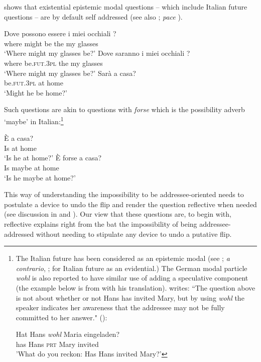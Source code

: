 \documentclass[output=paper,colorlinks,citecolor=brown]{langscibook}
\begin{document}
\citet{mari2021} shows that existential epistemic modal questions  -- which include Italian future questions  -- are by default self addressed (see also \citealt{eckardt2019}; \textit{pace} \citealt{IppolitoFarkas2021}).
   
\ea \label{potereques}
   \gll Dove possono essere i miei occhiali ? \\ 
   where might be the my glasses \\
   \glt `Where might my glasses be?' 
   \ex \label{fut1}
   \gll Dove saranno i miei occhiali ? \\ 
   where be\textsc{.fut.3pl} the my glasses \\
   \glt `Where might my glasses be?'
\ex \label{fut2} 
\gll Sar\`a a casa? \\ 
be.\textsc{fut.3pl} at home\\ 
\glt `Might he be home?'
\z


Such questions are akin to questions with \textit{forse} which is the possibility adverb `maybe' in Italian:\footnote{The Italian future has been considered as an epistemic modal (see \citealt{pietrandrea2005, mari2009, giannakidoumari2018a, baranzini2019}; \textit{a contrario}, \citealt{mari2010, frana2019a}; \citealt{eckardt2019} for Italian future as an evidential.) The German modal particle \textit{wohl} is also reported to have similar use of adding a speculative component (the example below is from \citealt{zimmermann2011} with his translation). \citet{zimmermann2011} writes: ``The question above is not about whether or not Hans has invited Mary, but by using \textit{wohl} the speaker indicates her awareness that the addressee may not be fully committed to her answer." (\citealt[2020]{zimmermann2011}):

\ea \gll Hat Hans \textit{wohl} Maria eingeladen? \\
has Hans \textsc{prt} Mary invited\\
\glt 'What do you reckon: Has Hans invited Mary?'
\z
} 

\ea 
\ea
\gll \`E a casa? \\
Is at home \\
\glt `Is he at home?'
\ex 
\gll 
\`E forse a casa? \\
Is maybe at home \\
\glt `Is he maybe at home?'
\z
\z


This way of understanding the impossibility to be addressee-oriented needs to postulate a device to undo the flip and render the question reflective when needed (see discussion in \citealt{frana2019a} and \citealt{mari2021}). Our view that these questions are, to begin with, reflective explains right from the bat the impossibility of being addressee-addressed without needing to stipulate any device to undo a putative flip.  
\end{document}
